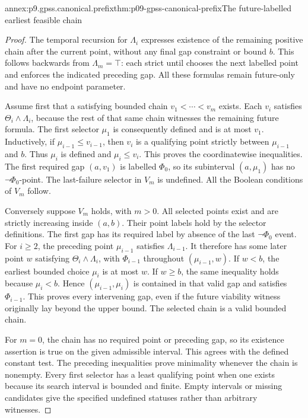 \begin{annexitem}{annex:p9.gpss.canonical.prefix}{thm:p09-gpss-canonical-prefix}{The future-labelled earliest feasible chain}
\begin{proof}
The temporal recursion for \(\Lambda_i\) expresses
existence of the remaining positive chain after the current
point, without any final gap constraint or bound \(b\).
This follows backwards from \(\Lambda_m=\top\): each
strict until chooses the next labelled point and enforces
the indicated preceding gap. All these formulas remain
future-only and have no endpoint parameter.

Assume first that a satisfying bounded chain
\(v_1<\cdots<v_m\) exists. Each \(v_i\) satisfies
\(\Theta_i\land\Lambda_i\), because the rest of that
same chain witnesses the remaining future formula. The
first selector \(\mu_1\) is consequently defined and
is at most \(v_1\). Inductively, if
\(\mu_{i-1}\leq v_{i-1}\), then \(v_i\) is a
qualifying point strictly between \(\mu_{i-1}\) and
\(b\). Thus \(\mu_i\) is defined and
\(\mu_i\leq v_i\). This proves the coordinatewise
inequalities. The first required gap \((a,v_1)\) is
labelled \(\Phi_0\), so its subinterval
\((a,\mu_1)\) has no \(\neg\Phi_0\)-point.
The last-failure selector in \(V_m\) is undefined.
All the Boolean conditions of \(V_m\) follow.

Conversely suppose \(V_m\) holds, with \(m>0\).
All selected points exist and are strictly increasing
inside \((a,b)\). Their point labels hold by the
selector definitions. The first gap has its required
label by absence of the last \(\neg\Phi_0\) event.
For \(i\geq2\), the preceding point \(\mu_{i-1}\)
satisfies \(\Lambda_{i-1}\). It therefore has some
later point \(w\) satisfying
\(\Theta_i\land\Lambda_i\), with \(\Phi_{i-1}\)
throughout \((\mu_{i-1},w)\). If \(w<b\),
the earliest bounded choice \(\mu_i\) is at most
\(w\). If \(w\geq b\), the same inequality
holds because \(\mu_i<b\). Hence
\((\mu_{i-1},\mu_i)\) is contained in that valid
gap and satisfies \(\Phi_{i-1}\). This proves
every intervening gap, even if the future viability
witness originally lay beyond the upper bound.
The selected chain is a valid bounded chain.

For \(m=0\), the chain has no required point
or preceding gap, so its existence assertion is
true on the given admissible interval. This agrees
with the defined constant test. The preceding
inequalities prove minimality whenever the chain
is nonempty. Every first selector has a least
qualifying point when one exists because its
search interval is bounded and finite. Empty
intervals or missing candidates give the specified
undefined statuses rather than arbitrary witnesses.
\end{proof}
\end{annexitem}

